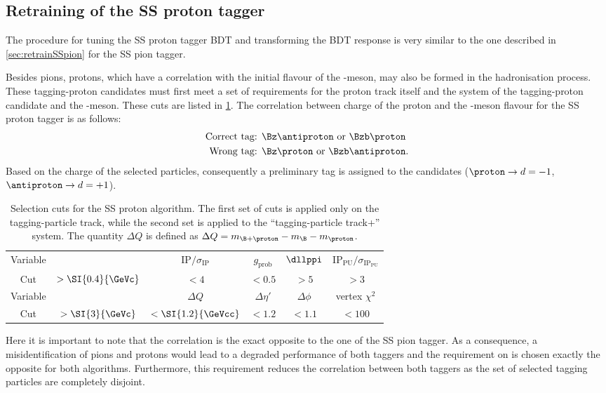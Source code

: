\subsection{Retraining of the SS proton tagger}
\label{sec:retrainSSproton}

The procedure for tuning the SS proton tagger BDT and transforming the BDT response is very similar to the one described in \cref{sec:retrainSSpion} for the SS pion tagger.

Besides pions, protons, which have a correlation with the initial flavour of the \B-meson, may also be formed in the hadronisation process.
These tagging-proton candidates must first meet a set of requirements for the proton track itself and the system of the tagging-proton candidate and the \B-meson.
These cuts are listed in \cref{tab:selectionSSProton}.
The correlation between charge of the proton and the \B-meson flavour for the SS proton tagger is as follows:
\begin{align*}
	\text{Correct tag: }& \Bz\antiproton \text{ or } \Bzb\proton\\
	\text{Wrong tag: }& \Bz\proton \text{ or } \Bzb\antiproton.
\end{align*}
Based on the charge of the selected particles, consequently a preliminary tag is assigned to the \B candidates ($\proton\rightarrow  d=-1$, $\antiproton\rightarrow d=+1$).
\begin{table}[bp]
	\centering
	\caption{Selection cuts for the SS proton algorithm.
	The first set of cuts is applied only on the tagging-particle track, while the second set is applied to the \enquote{tagging-particle track+\B} system.
	The quantity $\Delta Q$ is defined as $\Delta Q=m_{\B+\proton}-m_{\B}-m_{\proton}$.}
	\begin{tabular}{cccccc}
		\toprule
		Variable & \pt & $\text{IP}/\sigma_\text{IP}$ & $g_\text{prob}$ & $\dllppi$ & $\text{IP}_\text{PU}/\sigma_{\text{IP}_\text{PU}}$ \\
		Cut & $>\SI{0.4}{\GeVc}$ & $<4$ & $<0.5$ & $>5$ & $>3$ \\
		\midrule
		Variable & \pt & $\Delta Q$ & $\Delta\eta'$ & $\Delta\phi$  & vertex $\chi^2$ \\
		Cut & $>\SI{3}{\GeVc}$ & $<\SI{1.2}{\GeVcc}$ & $<1.2$ & $<1.1$ & $<100$ \\
		\bottomrule
	\end{tabular}
	\label{tab:selectionSSProton}
\end{table}

Here it is important to note that the correlation is the exact opposite to the one of the SS pion tagger.
As a consequence, a misidentification of pions and protons would lead to a degraded performance of both taggers and the requirement on \dllppi is chosen exactly the opposite for both algorithms.
Furthermore, this requirement reduces the correlation between both taggers as the set of selected tagging particles are completely disjoint.

